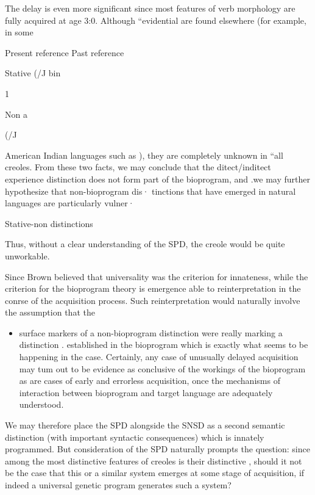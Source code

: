 The delay  is even more significant since most features of  verb morphology are fully acquired at age 3:0. Although ``evidential  are found elsewhere (for example, in some

Present reference Past reference

Stative (/J bin

\begin{table}
\caption{1}
\label{tab:3}
\end{table}

Non a

(/J

American Indian languages such as ), they are completely un\-known in ``all creoles. From these two facts, we may conclude that the ditect/inditect experience distinction does not form part of the bio\-program, and .we may further hypothesize that non-bioprogram dis· tinctions that have emerged in natural languages are particularly vulner·

Stative-non distinctions 

Thus, without a clear understanding of the SPD, the creole  would be quite unworkable.

Since Brown believed that universality was the criterion for innateness, while the criterion for the bioprogram theory is emergence
able to reinterpretation in the conrse of the acquisition process. Such reinterpretation would naturally involve the assumption that the

\begin{itemize}
\item surface markers of a non-bioprogram distinction were really marking a distinction . established in the bioprogram which is exactly what seems to be happening in the  case. Certainly, any case of unusually delayed acquisition may tum out to be evidence as conclusive
of the workings of the bioprogram as are cases of early and errorless acquisition, once the mechanisms of interaction between bioprogram and target language are adequately understood.
\end{itemize}



We may therefore place the SPD alongside the SNSD as a second
semantic distinction (with important syntactic consequences) which is innately programmed. But consideration of the SPD naturally prompts the question: since among the most distinctive features of creoles is their distinctive , should it not be the case that this or a similar system emerges at some stage of acquisition, if indeed a universal genetic program generates such a system?


